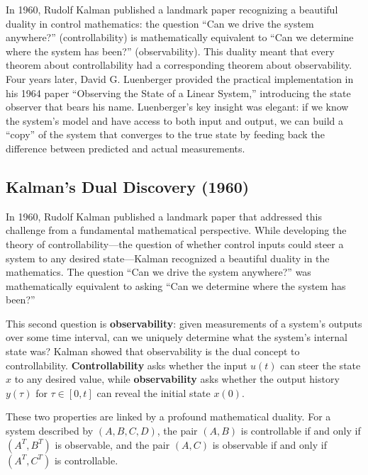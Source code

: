 \begin{historicalbox}
In 1960, Rudolf Kalman published a landmark paper recognizing a beautiful duality in control mathematics: the question ``Can we drive the system anywhere?'' (controllability) is mathematically equivalent to ``Can we determine where the system has been?'' (observability). This duality meant that every theorem about controllability had a corresponding theorem about observability. Four years later, David G. Luenberger provided the practical implementation in his 1964 paper ``Observing the State of a Linear System,'' introducing the state observer that bears his name. Luenberger's key insight was elegant: if we know the system's model and have access to both input and output, we can build a ``copy'' of the system that converges to the true state by feeding back the difference between predicted and actual measurements.
\end{historicalbox}

\subsection{Kalman's Dual Discovery (1960)}

In 1960, Rudolf Kalman published a landmark paper that addressed this challenge from a fundamental mathematical perspective. While developing the theory of controllability---the question of whether control inputs could steer a system to any desired state---Kalman recognized a beautiful duality in the mathematics. The question ``Can we drive the system anywhere?'' was mathematically equivalent to asking ``Can we determine where the system has been?''

This second question is \textbf{observability}: given measurements of a system's outputs over some time interval, can we uniquely determine what the system's internal state was? Kalman showed that observability is the dual concept to controllability. \textbf{Controllability} asks whether the input $u(t)$ can steer the state $x$ to any desired value, while \textbf{observability} asks whether the output history $y(\tau)$ for $\tau \in [0, t]$ can reveal the initial state $x(0)$.

These two properties are linked by a profound mathematical duality. For a system described by $(A, B, C, D)$, the pair $(A, B)$ is controllable if and only if $(A^T, B^T)$ is observable, and the pair $(A, C)$ is observable if and only if $(A^T, C^T)$ is controllable.

